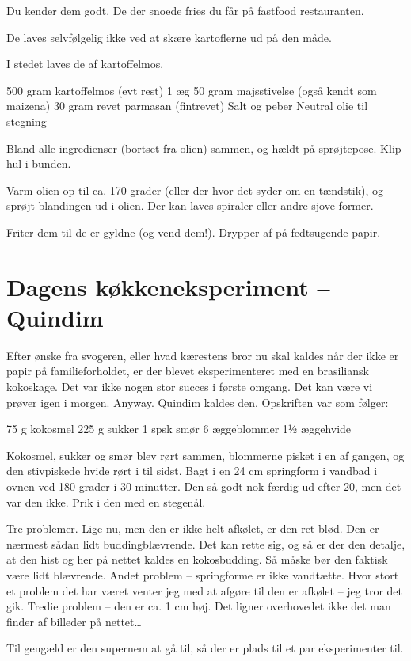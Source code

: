 \documentclass[
]{book}
\begin{document}
Du kender dem godt. De der snoede fries du får på fastfood restauranten.

De laves selvfølgelig ikke ved at skære kartoflerne ud på den måde.

I stedet laves de af kartoffelmos.

500 gram kartoffelmos (evt rest)
1 æg
50 gram majsstivelse (også kendt som maizena)
30 gram revet parmasan (fintrevet)
Salt og peber
Neutral olie til stegning

Bland alle ingredienser (bortset fra olien) sammen, og hældt på sprøjtepose. Klip hul i bunden.

Varm olien op til ca. 170 grader (eller der hvor det syder om en tændstik), og sprøjt blandingen ud i olien. Der kan laves spiraler eller andre sjove former.

Friter dem til de er gyldne (og vend dem!). Drypper af på fedtsugende papir.

\section{Dagens køkkeneksperiment -- Quindim}\label{dagens-kuxf8kkeneksperiment-quindim}

Efter ønske fra svogeren, eller hvad kærestens bror nu skal kaldes når der ikke er papir på familieforholdet, er der blevet eksperimenteret med en brasiliansk kokoskage. Det var ikke nogen stor succes i første omgang. Det kan være vi prøver igen i morgen. Anyway. Quindim kaldes den. Opskriften var som følger:

75 g kokosmel
225 g sukker
1 spsk smør
6 æggeblommer
1½ æggehvide

Kokosmel, sukker og smør blev rørt sammen, blommerne pisket i en af gangen, og den stivpiskede hvide rørt i til sidst. Bagt i en 24 cm springform i vandbad i ovnen ved 180 grader i 30 minutter. Den så godt nok færdig ud efter 20, men det var den ikke. Prik i den med en stegenål.

Tre problemer. Lige nu, men den er ikke helt afkølet, er den ret blød. Den er nærmest sådan lidt buddingblævrende. Det kan rette sig, og så er der den detalje, at den hist og her på nettet kaldes en kokosbudding. Så måske bør den faktisk være lidt blævrende. Andet problem -- springforme er ikke vandtætte. Hvor stort et problem det har været venter jeg med at afgøre til den er afkølet -- jeg tror det gik. Tredie problem -- den er ca. 1 cm høj. Det ligner overhovedet ikke det man finder af billeder på nettet\ldots{}

Til gengæld er den supernem at gå til, så der er plads til et par eksperimenter til.
\end{document}
